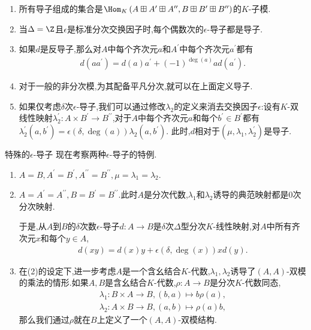 \begin{remark}{}{}
	\begin{enumerate}
		\item 所有导子组成的集合是$\Hom_{K}\left(A\boxplus A^{\prime}\boxplus A^{\prime\prime},B\boxplus B^{\prime}\boxplus B^{\prime\prime}\right)$的$K$-子模.
		\item 当$\Delta=\Z$且$\epsilon$是标准分次交换因子时,每个偶数次的$\epsilon$-导子都是导子.
		\item 如果$d$是反导子,那么对$A$中每个齐次元$a$和$A^{\prime}$中每个齐次元$a^{\prime}$都有
		\begin{align*}
			d\left(aa^{\prime}\right)=d\left(a\right)a^{\prime}+\left(-1\right)^{\deg\left(a\right)}ad\left(a^{\prime}\right).
		\end{align*}
		\item 对于一般的非分次模,为其配备平凡分次,就可以在上面定义导子.
		\item 如果仅考虑$\delta$次$\epsilon$-导子,我们可以通过修改$\lambda_{2}$的定义来消去交换因子$\epsilon$:设有$K$-双线性映射$\lambda^{\prime}_2: A \times B^{\prime} \to B^{\prime\prime}$,对于$A$中每个齐次元$a$和每个$b^{\prime}\in B^{\prime}$都有$\lambda^{\prime}_{2}\left(a,b^{\prime}\right)=\epsilon\left(\delta,\deg\left(a\right)\right)\lambda_{2}\left(a,b^{\prime}\right)$.
		此时,$d$相对于$\left(\mu,\lambda_{1},\lambda_{2}^{\prime}\right)$是导子.
	\end{enumerate}	
\end{remark}

\begin{example}{特殊的$\epsilon$-导子}{}
	现在考察两种$\epsilon$-导子的特例.
	\begin{enumerate}
		\item $A=B,A^{\prime}=B^{\prime},A^{\prime\prime}=B^{\prime\prime},\mu=\lambda_{1}=\lambda_{2}$.
		\item $A=A^{\prime}=A^{\prime\prime},B=B^{\prime}=B^{\prime\prime}$.此时$A$是分次代数,$\lambda_{1}$和$\lambda_{2}$诱导的典范映射都是$0$次分次映射.
		
		于是,从$A$到$B$的$\delta$次数$\epsilon$-导子$d:A\to B$是$\delta$次$\Delta$型分次$K$-线性映射,对$A$中所有齐次元$x$和每个$y\in A$,
		\begin{align*}
			d\left(xy\right)=d\left(x\right)y+\epsilon\left(\delta,\deg\left(x\right)\right)xd\left(y\right).
		\end{align*}
		\item 在(2)的设定下,进一步考虑$A$是一个含幺结合$K$-代数,$\lambda_{1},\lambda_{2}$诱导了$\left(A,A\right)$-双模的乘法的情形.如果$A,B$是含幺结合$K$-代数,$\rho:A\to B$是分次$K$-代数同态,
		\begin{align*}
			\lambda_{1}:B\times A\to B,\left(b,a\right)\mapsto b\rho\left(a\right),\\
			\lambda_{2}:A\times B\to B,\left(a,b\right)\mapsto\rho\left(a\right)b,
		\end{align*}
		那么我们通过$\rho$就在$B$上定义了一个$\left(A,A\right)$-双模结构.
	\end{enumerate}
\end{example}

